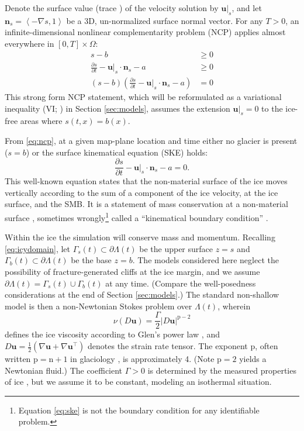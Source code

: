 \documentclass[hidelinks,onefignum,onetabnum,final]{siamart220329}  %
\newcommand{\grad}{\nabla}
\newcommand{\bn}{\mathbf{n}}
\newcommand{\bu}{\mathbf{u}}
\newcommand{\nn}{{\text{n}}}
\newcommand{\pp}{{\text{p}}}
\begin{document}
Denote the surface value (trace \cite{Evans2010}) of the velocity solution by $\bu|_s$, and let $\bn_s = \left<-\grad s,1\right>$ be a 3D, un-normalized surface normal vector.  For any $T>0$, an infinite-dimensional nonlinear complementarity problem (NCP) \cite{Bueler2021conservation,FacchineiPang2003,SchoofHewitt2013} applies almost everywhere in $[0,T]\times \Omega$:
\begin{subequations}
\label{eq:ncp}
\begin{align}
s - b &\ge 0 \\
\frac{\partial s}{\partial t} - \bu|_s \cdot \bn_s - a &\ge 0 \\
(s - b) \left(\frac{\partial s}{\partial t} - \bu|_s \cdot \bn_s - a\right) &= 0
\end{align}
\end{subequations}
This strong form NCP statement, which will be reformulated as a variational inequality (VI; \cite{KinderlehrerStampacchia1980}) in Section \ref{sec:models}, assumes the extension $\bu|_s=0$  to the ice-free areas where $s(t,x)=b(x)$.

From \eqref{eq:ncp}, at a given map-plane location and time either no glacier is present ($s=b$) or the surface kinematical equation (SKE) holds:
\begin{equation}
\frac{\partial s}{\partial t} - \bu|_s \cdot \bn_s - a = 0.  \label{eq:ske}
\end{equation}
This well-known equation \cite{SchoofHewitt2013} states that the non-material surface of the ice moves vertically according to the sum of a component of the ice velocity, at the ice surface, and the SMB.  It is a statement of mass conservation at a non-material surface \cite{Aschwandenetal2012}, sometimes wrongly\footnote{Equation \eqref{eq:ske} is not the boundary condition for any identifiable problem.} called a ``kinematical boundary condition'' \cite{GreveBlatter2009}.

Within the ice the simulation will conserve mass and momentum.  Recalling \eqref{eq:icydomain}, let $\Gamma_s(t) \subset \partial \Lambda(t)$ be the upper surface $z=s$ and
$\Gamma_b(t) \subset \partial \Lambda(t)$ be the base $z=b$.  The models considered here neglect the possibility of fracture-generated cliffs at the ice margin, and we assume $\partial \Lambda(t) = \Gamma_s(t) \cup \Gamma_b(t)$ at any time.  (Compare the well-posedness considerations at the end of Section \ref{sec:models}.)  The standard non-shallow model is then a non-Newtonian Stokes problem \cite{GreveBlatter2009,JouvetRappaz2011,SchoofHewitt2013} over $\Lambda(t)$, wherein
\begin{equation}
\nu(D\bu) = \frac{\Gamma}{2} |D\bu|^{\pp-2} \label{eq:glen}
\end{equation}
defines the ice viscosity according to Glen's power law \cite{GreveBlatter2009}, and $D\bu=\frac{1}{2}(\grad \bu + \grad \bu^{\top})$ denotes the strain rate tensor.  The exponent $\pp$, often written $\pp=\nn+1$ in glaciology \cite{GoldsbyKohlstedt2001}, is approximately 4.  (Note $\pp=2$ yields a Newtonian fluid.)  The coefficient $\Gamma>0$ is determined by the measured properties of ice \cite{GoldsbyKohlstedt2001,GreveBlatter2009}, but we assume it to be constant, modeling an isothermal situation.
\end{document}
